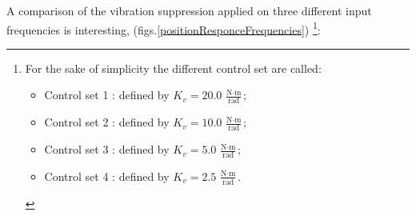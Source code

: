 


A comparison of the vibration suppression applied on three
different input frequencies is interesting, (figs.\ref{positionResponceFrequencies})
\footnote{For the sake of simplicity the different control set are called:
	\begin{itemize}
		\item Control set 1 : defined by $ K_v = 20.0 \ \frac{\text{N} \cdot \text{m}}{\text{rad}}$;
		\item Control set 2 : defined by $ K_v = 10.0 \ \frac{\text{N} \cdot \text{m}}{\text{rad}}$;
		\item Control set 3 : defined by $ K_v = 5.0 \ \frac{\text{N} \cdot \text{m}}{\text{rad}}$;
		\item Control set 4 : defined by $ K_v = 2.5 \ \frac{\text{N} \cdot \text{m}}{\text{rad}}$.	
\end{itemize}
}:

